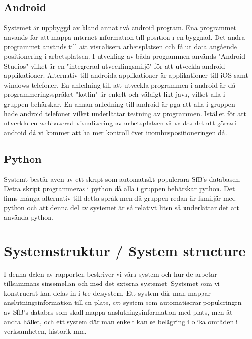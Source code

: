 \documentclass[a4paper,12pt]{article}
\begin{document}
\subsection{Android}
Systemet är uppbyggd av bland annat två android program. Ena programmet används för att mappa internet information till position i en byggnad. Det andra programmet används till att visualisera arbetsplatsen och få ut data angående positionering i arbetsplatsen. I utvekling av båda programmen används "Android Studios" vilket är en "integrerad utvecklingsmiljö" för att utveckla android applikationer. Alternativ till androida applikationer är applikationer till iOS samt windows telefoner. En anledning till att utveckla programmen i android är då programmeringsspråket "kotlin" är enkelt och väldigt likt java, vilket alla i gruppen behärskar. En annan anledning till android är pga att alla i gruppen hade android telefoner vilket underlättar testning av programmen. Istället för att utveckla en webbaserad visualisering av arbetsplatsen så valdes det att göras i android då vi kommer att ha mer kontroll över inomhuspositioneringen då. %

\subsection{Python}
Systemt består även av ett skript som automatiskt populerara SfB's databasen. Detta skript programmeras i python då alla i gruppen behärskar python. Det finns många alternativ till detta språk men då gruppen redan är familjär med python och att denna del av systemet är så relativt liten så underlättar det att använda python.


\section{Systemstruktur / System structure}
I denna delen av rapporten beskriver vi våra system och hur de arbetar tillsammans sinsemellan och med det externa systemet.
Systemet som vi konstruerat kan delas in i tre delsystem. Ett system där man mappar anslutningsinformation till en plats, ett system som automatiserar populeringen av SfB's databas som skall mappa anslutningsinformation med plats, men åt andra hållet, och ett system där man enkelt kan se belägring i olika områden i verksamheten, historik mm.
\end{document}
